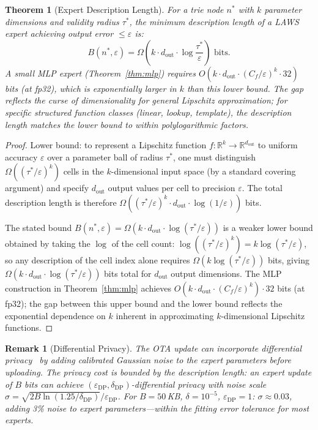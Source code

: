 \documentclass[11pt]{article}
\newtheorem{theorem}{Theorem}
\newtheorem{remark}{Remark}
\begin{document}
\begin{theorem}[Expert Description Length]
\label{thm:expert_size}
For a trie node $n^*$ with $k$ parameter dimensions and validity radius $\tau^*$,
the minimum description length of a LAWS expert achieving output error $\leq
\varepsilon$ is:
\[
  B(n^*, \varepsilon) = \Omega\!\left(k \cdot d_{\mathrm{out}} \cdot \log\frac{\tau^*}{\varepsilon}\right)
  \text{ bits}.
\]
A small MLP expert (Theorem~\ref{thm:mlp}) requires
$O(k \cdot d_{\mathrm{out}} \cdot (C_f/\varepsilon)^k \cdot 32)$ bits (at fp32),
which is exponentially larger in $k$ than this lower bound.  The gap reflects
the \emph{curse of dimensionality} for general Lipschitz approximation; for
specific structured function classes (linear, lookup, template), the
description length matches the lower bound to within polylogarithmic factors.
\end{theorem}

\begin{proof}
Lower bound: to represent a Lipschitz function $f: \mathbb{R}^k \to \mathbb{R}^{d_{\mathrm{out}}}$
to uniform accuracy $\varepsilon$ over a parameter ball of radius $\tau^*$,
one must distinguish $\Omega((\tau^*/\varepsilon)^k)$ cells in the $k$-dimensional
input space (by a standard covering argument) and specify $d_{\mathrm{out}}$ output values per
cell to precision $\varepsilon$.  The total description length is therefore
$\Omega((\tau^*/\varepsilon)^k \cdot d_{\mathrm{out}} \cdot \log(1/\varepsilon))$ bits.

The stated bound $B(n^*, \varepsilon) = \Omega(k \cdot d_{\mathrm{out}} \cdot \log(\tau^*/\varepsilon))$
is a weaker lower bound obtained by taking the $\log$ of the cell count:
$\log((\tau^*/\varepsilon)^k) = k \log(\tau^*/\varepsilon)$, so any description
of the cell index alone requires $\Omega(k \log(\tau^*/\varepsilon))$ bits,
giving $\Omega(k \cdot d_{\mathrm{out}} \cdot \log(\tau^*/\varepsilon))$ bits total for $d_{\mathrm{out}}$
output dimensions.  The MLP construction in Theorem~\ref{thm:mlp} achieves
$O(k \cdot d_{\mathrm{out}} \cdot (C_f/\varepsilon)^k) \cdot 32$ bits (at fp32); the gap between this upper
bound and the lower bound reflects the exponential dependence on $k$ inherent
in approximating $k$-dimensional Lipschitz functions.
\end{proof}

\begin{remark}[Differential Privacy]
The OTA update can incorporate differential privacy~\cite{dwork2006dp} by adding
calibrated Gaussian noise to the expert parameters before uploading.  The privacy
cost is bounded by the description length: an expert update of $B$ bits can
achieve $(\varepsilon_{\mathrm{DP}}, \delta_{\mathrm{DP}})$-differential privacy
with noise scale $\sigma = \sqrt{2 B \ln(1.25/\delta_{\mathrm{DP}})} /
\varepsilon_{\mathrm{DP}}$.  For $B = 50$\,KB, $\delta = 10^{-5}$,
$\varepsilon_{\mathrm{DP}} = 1$: $\sigma \approx 0.03$, adding 3\% noise to
expert parameters---within the fitting error tolerance for most experts.
\end{remark}
\end{document}
